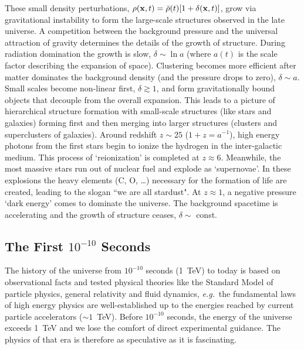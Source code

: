 \documentclass[12pt,letterpaper,rotate]{article}
\begin{document}
{These small density perturbations, $\rho({\bf x}, t) = \bar \rho(t) [1+ \delta({\bf x}, t)]$, grow via gravitational instability to form the large-scale structures observed in the late universe. 
A competition between the background pressure and the universal attraction of gravity determines the details of the growth of structure.
During radiation domination the growth is slow, $\delta \sim \ln a$ (where $a(t)$ is the scale factor describing the expansion of space).  Clustering becomes more efficient after matter dominates the background density (and the pressure drops to zero), $\delta \sim a$.   Small scales become non-linear first, $\delta \gtrsim 1$, and form gravitationally bound objects that decouple from the overall expansion.
This leads to a picture of hierarchical structure formation with small-scale structures (like stars and galaxies) forming first and then merging into larger structures (clusters and superclusters of galaxies).
Around redshift $z \sim 25$ ($1+z = a^{-1}$), high energy photons from the first stars begin to ionize the hydrogen in the inter-galactic medium. This process of `reionization' is completed at $z \approx 6$.
Meanwhile, the most massive stars run out of nuclear fuel and explode as `supernovae'.
In these explosions the heavy elements (C, O, \dots) necessary for the formation of life are created,  leading to the slogan ``we are all stardust".
At $z \approx 1$, a negative pressure `dark energy' comes to dominate the universe.
The background spacetime is accelerating and the growth of structure ceases, $\delta \sim$ const.


\subsection{The First $10^{-10}$ Seconds}

The history of the universe from $10^{-10}$ seconds (1~TeV) to today is based on observational facts and tested physical theories like the Standard Model of particle physics, general relativity and fluid dynamics, {\it e.g.}~the fundamental laws of high energy physics are well-established up to the energies reached by current particle accelerators ($\sim 1$~TeV).  
Before $10^{-10}$ seconds, the energy of the universe exceeds 1~TeV and we lose the comfort of direct experimental guidance.
The physics of that era is therefore as speculative as it is fascinating.

}
\end{document}
